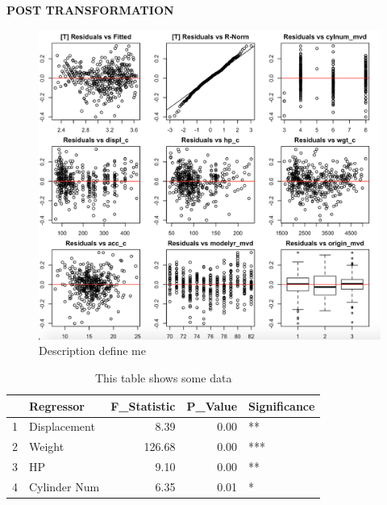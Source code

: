 \documentclass{article}
\begin{document}
\clearpage
\newpage

\textbf{POST TRANSFORMATION}

\begin{figure}
	\centering
	\includegraphics[width=1\linewidth]{15-23t_resall}
	\caption[TOC Define Me]
	{Description define me}
\end{figure}

\clearpage
\newpage 

\begin{table}[ht]
\centering
\begin{tabular}{rlrrl}
  \hline
 & Regressor & F\_Statistic & P\_Value & Significance \\ 
  \hline
1 & Displacement & 8.39 & 0.00 & ** \\ 
  2 & Weight & 126.68 & 0.00 & *** \\ 
  3 & HP & 9.10 & 0.00 & ** \\ 
  4 & Cylinder Num & 6.35 & 0.01 & * \\ 
   \hline
\end{tabular}
\caption{This table shows some data}
\label{tab:myfirsttable}
\end{table}

\clearpage
\newpage 
\end{document}
